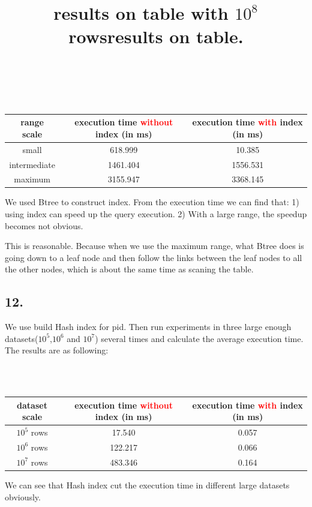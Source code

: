 \documentclass[10pt]{article}
\begin{document}
\begin{center}
\title{results on table with $10^8$ rows}
\\ \hspace*{\fill} \\
\begin{tabular}{c|c|c}
\hline
range scale & execution time \textcolor{red}{without} index (in ms) & execution time \textcolor{red}{with} index (in ms) \\ \hline
small & 618.999 & 10.385 \\
intermediate & 1461.404 & 1556.531 \\
maximum & 3155.947 & 3368.145 \\
\hline
\end{tabular}
\end{center}

We used Btree to construct index. From the execution time we can find that: 1) using index can speed up the query execution. 2) With a large range, the speedup becomes not obvious.

This is reasonable. Because when we use the maximum range, what Btree does is going down to a leaf node and then follow the links between the leaf nodes to all the other nodes, which is about the same time as scaning the table.
\subsection*{12.}

We use build Hash index for pid. Then run experiments in three large enough datasets($10^5$,$10^6$ and $10^7$) several times and calculate the average execution time. The results are as following: 
\begin{center}
\title{results on table.}
\\ \hspace*{\fill} \\
\begin{tabular}{c|c|c}
\hline
dataset scale & execution time \textcolor{red}{without} index (in ms) & execution time \textcolor{red}{with} index (in ms) \\ \hline
$10^5$ rows &  17.540 & 0.057 \\
$10^6$ rows & 122.217 & 0.066 \\
$10^7$ rows & 483.346 & 0.164 \\
\hline
\end{tabular}
\end{center}

We can see that Hash index cut the execution time in different large datasets obviously.
\end{document}
